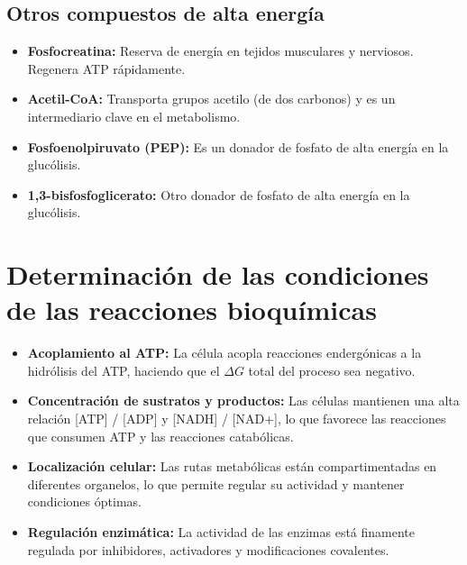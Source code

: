 \subsection{Otros compuestos de alta energía}
\begin{itemize}
    \item \textbf{Fosfocreatina:} Reserva de energía en tejidos musculares y nerviosos. Regenera ATP rápidamente.
    \item \textbf{Acetil-CoA:} Transporta grupos acetilo (de dos carbonos) y es un intermediario clave en el metabolismo.
    \item \textbf{Fosfoenolpiruvato (PEP):} Es un donador de fosfato de alta energía en la glucólisis.
    \item \textbf{1,3-bisfosfoglicerato:} Otro donador de fosfato de alta energía en la glucólisis.
\end{itemize}

\section{Determinación de las condiciones de las reacciones bioquímicas}

\begin{itemize}
    \item \textbf{Acoplamiento al ATP:} La célula acopla reacciones endergónicas a la hidrólisis del ATP, haciendo que el $\Delta G$ total del proceso sea negativo.
    \item \textbf{Concentración de sustratos y productos:} Las células mantienen una alta relación [ATP] / [ADP] y [NADH] / [NAD+], lo que favorece las reacciones que consumen ATP y las reacciones catabólicas.
    \item \textbf{Localización celular:} Las rutas metabólicas están compartimentadas en diferentes organelos, lo que permite regular su actividad y mantener condiciones óptimas.
    \item \textbf{Regulación enzimática:} La actividad de las enzimas está finamente regulada por inhibidores, activadores y modificaciones covalentes.
\end{itemize}